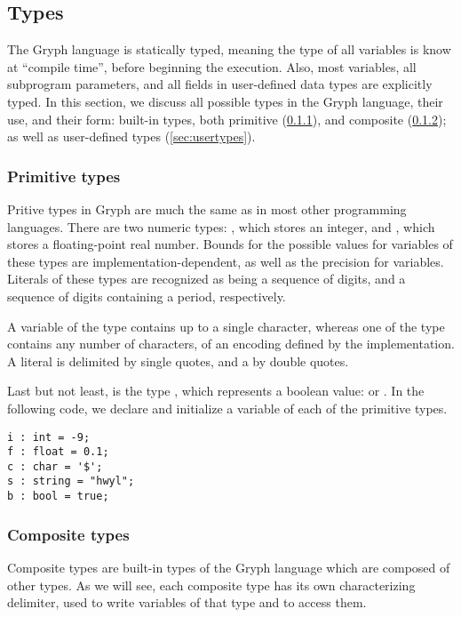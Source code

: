 \subsection{Types}
\label{sec:types}
The Gryph language is statically typed, meaning the type of all variables is know at ``compile time'', before beginning the execution. Also, most variables, all subprogram parameters, and all fields in user-defined data types are explicitly typed. In this section, we discuss all possible types in the Gryph language, their use, and their form: built-in types, both primitive (\ref{sec:primitive}), and composite (\ref{sec:composite}); as well as user-defined types (\ref{sec:usertypes}).
\subsubsection{Primitive types}
\label{sec:primitive}
Pritive types in Gryph are much the same as in most other programming languages. There are two numeric types: , which stores an integer, and , which stores a floating-point real number. Bounds for the possible values for variables of these types are implementation-dependent, as well as the precision for  variables. Literals of these types are recognized as being a sequence of digits, and a sequence of digits containing a period, respectively.

A variable of the  type contains up to a single character, whereas one of the  type contains any number of characters, of an encoding defined by the implementation. A  literal is delimited by single quotes, and a  by double quotes. 

Last but not least, is the type , which represents a boolean value:  or . In the following code, we declare and initialize a variable of each of the primitive types.
\begin{lstlisting}[language=Gryph]
i : int = -9;
f : float = 0.1;
c : char = '$';
s : string = "hwyl";
b : bool = true;
\end{lstlisting}

\subsubsection{Composite types}
\label{sec:composite}
Composite types are built-in types of the Gryph language which are composed of other types. As we will see, each composite type has its own characterizing delimiter, used to write variables of that type and to access them.

